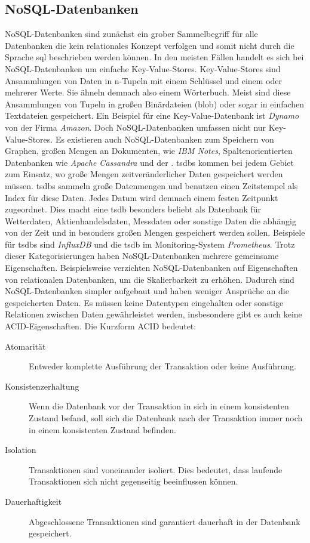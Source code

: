 \documentclass[titlepage]{report}
\begin{document}
\subsection{NoSQL\hyp{}Datenbanken}
NoSQL\hyp{}Datenbanken sind zunächst ein grober Sammelbegriff für alle
Datenbanken die kein relationales Konzept verfolgen und somit nicht
durch die Sprache \gls{sql} beschrieben werden können. In den meisten
Fällen handelt es sich bei NoSQL\hyp{}Datenbanken um einfache
Key\hyp{}Value\hyp{}Stores. Key\hyp{}Value\hyp{}Stores sind Ansammlungen
von Daten in n\hyp{}Tupeln mit einem Schlüssel und einem oder mehrerer
Werte. Sie ähneln
demnach also einem Wörterbuch. Meist sind diese Ansammlungen von Tupeln
in großen Binärdateien (\gls{blob}) oder sogar in einfachen Textdateien
gespeichert. Ein Beispiel für eine Key\hyp{}Value\hyp{}Datenbank ist
\emph{Dynamo} von der Firma \emph{Amazon}. Doch NoSQL\hyp{}Datenbanken
umfassen nicht nur Key\hyp{}Value\hyp{}Stores. Es existieren auch
NoSQL\hyp{}Datenbanken zum Speichern von Graphen, großen Mengen an
Dokumenten, wie \emph{IBM Notes}, Spaltenorientierten Datenbanken wie
\emph{Apache Cassandra} und der . \glspl{tsdb} kommen bei
jedem Gebiet zum Einsatz, wo große Mengen zeitveränderlicher Daten
gespeichert werden müssen. \glspl{tsdb} sammeln große Datenmengen und
benutzen einen Zeitstempel als Index für diese Daten. Jedes Datum wird
demnach einem festen Zeitpunkt zugeordnet. Dies macht eine \gls{tsdb}
besonders beliebt als Datenbank für Wetterdaten,
Aktienhandelsdaten, Messdaten oder sonstige Daten die abhängig von der
Zeit und in besonders großen Mengen gespeichert werden sollen. Beispiele
für \glspl{tsdb} sind \emph{InfluxDB} und die \gls{tsdb} im
Monitoring\hyp{}System \emph{Prometheus}. Trotz dieser Kategorisierungen
haben NoSQL\hyp{}Datenbanken mehrere gemeinsame Eigenschaften.
Beispielsweise verzichten NoSQL\hyp{}Datenbanken auf Eigenschaften von
relationalen Datenbanken, um die Skalierbarkeit zu erhöhen\cite[S. 13]{TSDB}. Dadurch sind
NoSQL\hyp{}Datenbanken simpler aufgebaut und haben weniger Ansprüche an
die gespeicherten Daten. Es müssen keine Datentypen eingehalten oder
sonstige Relationen zwischen Daten gewährleistet werden, insbesondere
gibt es auch keine ACID\hyp{}Eigenschaften. Die Kurzform ACID 
bedeutet\cite{NOSQLKRAMER}\cite{SQLLEIPZIG}:
\begin{description}
    \item[Atomarität] Entweder komplette Ausführung der Transaktion oder
        keine Ausführung.
    \item[Konsistenzerhaltung] Wenn die Datenbank vor der Transaktion in
        sich in einem konsistenten Zustand befand, soll sich die
        Datenbank nach der Transaktion immer noch in einem konsistenten
        Zustand befinden.
    \item[Isolation] Transaktionen sind voneinander isoliert. Dies
        bedeutet, dass laufende Transaktionen sich nicht gegenseitig
        beeinflussen können.
    \item[Dauerhaftigkeit] Abgeschlossene Transaktionen sind garantiert
        dauerhaft in der Datenbank gespeichert.
\end{description}
\end{document}
